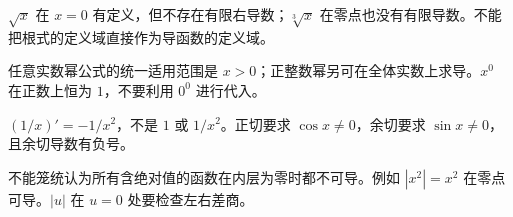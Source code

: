 \begin{trapbox}
\begin{minipage}{\linewidth}
\begin{description}[style=nextline,leftmargin=2.8em,labelsep=.5em]
\item[\textbf{\textcolor{CTrap}{易错点四（定义域与可导域混淆）}}] $\sqrt x$ 在 $x=0$ 有定义，但不存在有限右导数；$\sqrt[3]x$ 在零点也没有有限导数。不能把根式的定义域直接作为导函数的定义域。
\end{description}

\end{minipage}
\end{trapbox}

\begin{trapbox}
\begin{minipage}{\linewidth}
\begin{description}[style=nextline,leftmargin=2.8em,labelsep=.5em]
\item[\textbf{\textcolor{CTrap}{易错点五（幂函数零点）}}] 任意实数幂公式的统一适用范围是 $x>0$；正整数幂另可在全体实数上求导。$x^0$ 在正数上恒为 $1$，不要利用 $0^0$ 进行代入。
\end{description}

\end{minipage}
\end{trapbox}

\begin{trapbox}
\begin{minipage}{\linewidth}
\begin{description}[style=nextline,leftmargin=2.8em,labelsep=.5em]
\item[\textbf{\textcolor{CTrap}{易错点六（倒数与三角分母）}}] $(1/x)'=-1/x^2$，不是 $1$ 或 $1/x^2$。正切要求 $\cos x\ne0$，余切要求 $\sin x\ne0$，且余切导数有负号。
\end{description}


\end{minipage}
\end{trapbox}

\begin{trapbox}
\begin{minipage}{\linewidth}
\begin{description}[style=nextline,leftmargin=2.8em,labelsep=.5em]
\item[\textbf{\textcolor{CTrap}{易错点七（绝对值零点）}}] 不能笼统认为所有含绝对值的函数在内层为零时都不可导。例如 $|x^2|=x^2$ 在零点可导。$|u|$ 在 $u=0$ 处要检查左右差商。
\end{description}

\end{minipage}
\end{trapbox}

